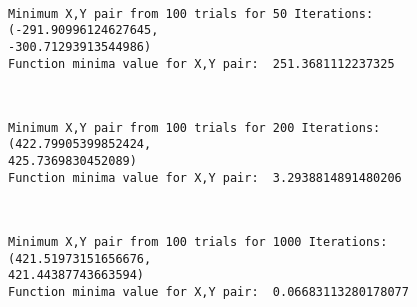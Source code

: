 \documentclass[11pt]{article}
\begin{document}
    \begin{center}
    \end{center}
    { \hspace*{\fill} \\}
    
    \begin{Verbatim}[commandchars=\\\{\}]
Minimum X,Y pair from 100 trials for 50 Iterations: (-291.90996124627645,
-300.71293913544986)
Function minima value for X,Y pair:  251.3681112237325
    \end{Verbatim}

    \begin{center}
    \end{center}
    { \hspace*{\fill} \\}
    
    \begin{Verbatim}[commandchars=\\\{\}]
Minimum X,Y pair from 100 trials for 200 Iterations: (422.79905399852424,
425.7369830452089)
Function minima value for X,Y pair:  3.2938814891480206
    \end{Verbatim}

    \begin{center}
    \end{center}
    { \hspace*{\fill} \\}
    
    \begin{Verbatim}[commandchars=\\\{\}]
Minimum X,Y pair from 100 trials for 1000 Iterations: (421.51973151656676,
421.44387743663594)
Function minima value for X,Y pair:  0.06683113280178077
    \end{Verbatim}

    \begin{center}
    \end{center}
    { \hspace*{\fill} \\}
    
\end{document}

